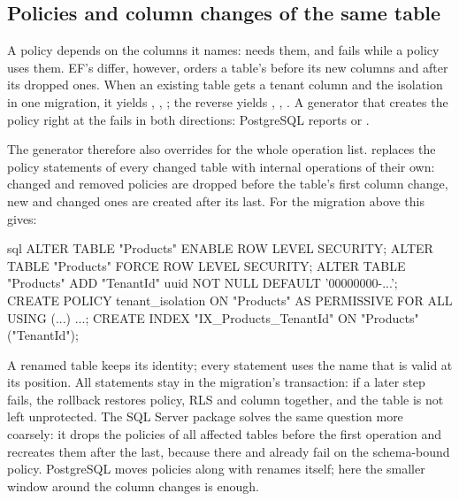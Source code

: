 \subsection*{Policies and column changes of the same table}

A policy depends on the columns it names:  needs them, and
 fails while a policy uses them. EF's differ, however, orders a table's
 before its new columns and after its dropped
ones. When an existing table gets a tenant column and the isolation in one migration, it yields
, , ;
the reverse yields , ,
. A generator that creates the policy right at the
 fails in both directions: PostgreSQL reports
 or .

The generator therefore also overrides  for the whole operation list.
 replaces the policy statements of every changed
table with internal operations of their own: changed and removed policies are dropped before the
table's first column change, new and changed ones are created after its last. For the migration
above this gives:

\begin{sourcecode}{sql}
ALTER TABLE "Products" ENABLE ROW LEVEL SECURITY;
ALTER TABLE "Products" FORCE ROW LEVEL SECURITY;
ALTER TABLE "Products" ADD "TenantId" uuid NOT NULL DEFAULT '00000000-...';
CREATE POLICY tenant_isolation ON "Products" AS PERMISSIVE FOR ALL USING (...) ...;
CREATE INDEX "IX_Products_TenantId" ON "Products" ("TenantId");
\end{sourcecode}

A renamed table keeps its identity; every statement uses the name that is valid at its position.
All statements stay in the migration's transaction: if a later step fails, the rollback restores
policy, RLS and column together, and the table is not left unprotected. The SQL Server package
solves the same question more coarsely: it drops the policies of all affected tables before the
first operation and recreates them after the last, because there  and
 already fail on the schema-bound policy. PostgreSQL moves policies along with
renames itself; here the smaller window around the column changes is enough.

